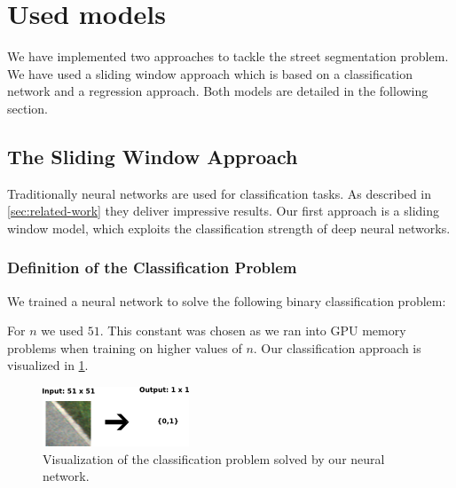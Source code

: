 
\section{Used models}\label{sec:model}

We have implemented two approaches to tackle  the street segmentation problem.
We have used a sliding window approach which is based on a classification
network and a regression approach. Both models are detailed in the following
section.

\subsection{The Sliding Window Approach}
Traditionally neural networks are used for classification tasks. As
described in \cref{sec:related-work} they deliver impressive results. Our first
approach is a sliding window model, which exploits the classification strength
of deep neural networks.

\subsubsection{Definition of the Classification Problem}
We trained a neural network to solve the following binary classification
problem:


For $n$ we used $51$. This constant was chosen as we ran into GPU memory
problems when training on higher values of $n$. Our classification approach is
visualized in \cref{fig:figure}.

\begin{figure}[H]
    \centering
    \includegraphics[width=0.5\columnwidth]{figures/models/sliding_window.png}
    \caption{Visualization of the classification problem solved by our neural network.}%
\label{fig:figure}
\end{figure}


